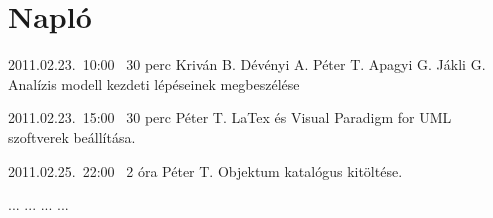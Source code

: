 %
\section{Napló}

\begin{naplo}

\bejegyzes
{2011.02.23.~10:00~} %
{30 perc} %
{Kriván B. \newline
Dévényi A. \newline
Péter T. \newline
Apagyi G. \newline
Jákli G.} %
{Analízis modell kezdeti lépéseinek megbeszélése} %

\bejegyzes
{2011.02.23.~15:00~}
{30 perc}
{Péter T.}
{LaTex és Visual Paradigm for UML szoftverek beállítása.}

\bejegyzes
{2011.02.25.~22:00~} %
{2 óra} %
{Péter T.} %
{Objektum katalógus kitöltése.} %


\bejegyzes
{...}
{...}
{...}
{...}


\end{naplo}

